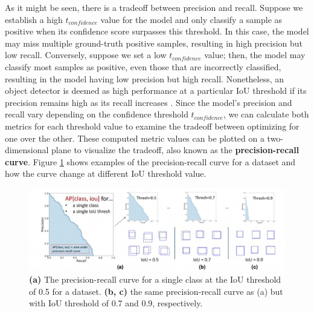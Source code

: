 As it might be seen, there is a tradeoff between precision and recall. Suppose we establish a high $t_{confidence}$ value for the model and only classify a sample as positive when its confidence score surpasses this threshold. In this case, the model may miss multiple ground-truth positive samples, resulting in high precision but low recall. Conversely, suppose we set a low $t_{confidence}$ value; then, the model may classify most samples as positive, even those that are incorrectly classified, resulting in the model having low precision but high recall. Nonetheless, an object detector is deemed as high performance at a particular IoU threshold if its precision remains high as its recall increases \cite{metrics_survey_2020}. Since the model's precision and recall vary depending on the confidence threshold $t_{confidence}$, we can calculate both metrics for each threshold value to examine the tradeoff between optimizing for one over the other. These computed metric values can be plotted on a two-dimensional plane to visualize the tradeoff, also known as the \textbf{precision-recall curve}. Figure \ref{fig:precision-recall_curve} shows examples of the precision-recall curve for a dataset and how the curve change at different IoU threshold value.

\begin{figure}[!ht]
    \centering
    \includegraphics[width=5.5in]{figures/precision_recall_curve.png}
    \caption{\textbf{(a)} The precision-recall curve for a single class at the IoU threshold of 0.5 for a dataset. \textbf{(b, c)} the same precision-recall curve as (a) but with IoU threshold of 0.7 and 0.9, respectively. \cite{szeliski_cv_book}} 
    \label{fig:precision-recall_curve}
\end{figure}

